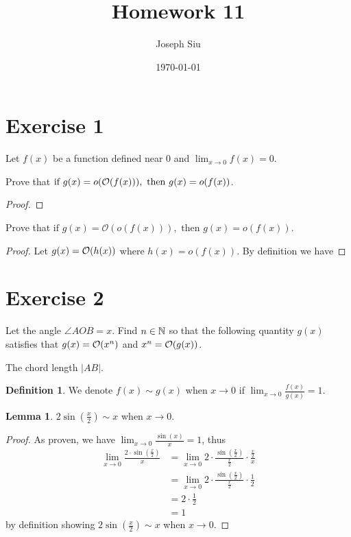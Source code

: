 \documentclass{homework}
\author{Joseph Siu}
\date{\today}
\title{Homework 11}
\newcommand{\N}{\bb{N}} %
\newcommand{\?}{\stackrel{?}{=}}
\theoremstyle{definition}
\newtheorem*{definition}{Definition}
\newtheorem*{lemma}{Lemma}
\begin{document}
 \maketitle

\section*{Exercise 1}

Let $f(x)$ be a function defined near 0 and $\displaystyle\lim_{x\to0}f(x)=0$.

\question[1] Prove that $\textup{if~}g(x)=o(\mathcal{O}(f(x))),\mathrm{~then~}g(x)=o(f(x))$. 

\begin{proof}
    
\end{proof}

\question[2] Prove that $\text{if~}g(x)=\mathcal{O}(o(f(x))),\text{~then~}g(x)=o(f(x))$.

\begin{proof}
    Let $g(x)=\cal{O}(h(x))$ where $h(x)=o(f(x))$. By definition we have 
\end{proof}

\newpage
\section*{Exercise 2}
Let the angle $\angle AOB=x$. Find $n\in\N$ so that the following quantity $g(x)$ satisfies that $g(x)=\cal{O}(x^n)$ and $x^n=\cal{O}(g(x))$.


\question[1] The chord length $|AB|$.

\begin{definition}
    We denote $f(x)\sim g(x)$ when $x\to0$ if $\lim_{x\to0}\frac{f(x)}{g(x)}=1$.
\end{definition}

\begin{lemma}
    $2\sin(\frac{x}2)\sim x$ when $x\to0$.

    \begin{proof}
        As proven, we have $\lim_{x\to0}\frac{\sin(x)}{x}=1$, thus \begin{align*}
            \lim_{x\to0}\frac{2\cdot\sin(\frac{x}2)}{x}&=\lim_{x\to0}2\cdot\frac{\sin(\frac{x}2)}{\frac{x}2}\cdot\frac{\frac{x}2}{x}\\
            &=\lim_{x\to0}2\cdot\frac{\sin(\frac{x}2)}{\frac{x}2}\cdot\frac12\\
            &=2\cdot\frac12\\
            &=1
        \end{align*}
        by definition showing $2\sin(\frac{x}2)\sim x$ when $x\to0$.
    \end{proof}
\end{lemma}
\end{document}
